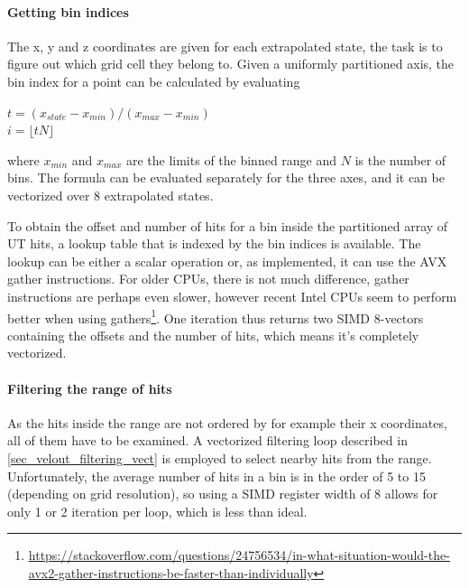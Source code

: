 \documentclass[12pt]{article}
\begin{document}
\paragraph{Getting bin indices} \mbox{}\vspace{0.4pc}

The x, y and z coordinates are given for each extrapolated state, the task is to figure out which grid cell they belong to. Given a uniformly partitioned axis, the bin index for a point can be calculated by evaluating
\begin{center}
	$t = (x_{state} - x_{min})/(x_{max} - x_{min})$\\
	$i =  \lfloor t N \rfloor$	
\end{center}
where $x_{min}$ and $x_{max}$ are the limits of the binned range and $N$ is the number of bins. The formula can be evaluated separately for the three axes, and it can be vectorized over 8 extrapolated states.

To obtain the offset and number of hits for a bin inside the partitioned array of UT hits, a lookup table that is indexed by the bin indices is available. The lookup can be either a scalar operation or, as implemented, it can use the AVX gather instructions. For older CPUs, there is not much difference, gather instructions are perhaps even slower, however recent Intel CPUs seem to perform better when using gathers\footnote{\href{https://stackoverflow.com/questions/24756534/in-what-situation-would-the-avx2-gather-instructions-be-faster-than-individually}{https://stackoverflow.com/questions/24756534/in-what-situation-would-the-avx2-gather-instructions-be-faster-than-individually}}. One iteration thus returns two SIMD 8-vectors containing the offsets and the number of hits, which means it's completely vectorized.


\paragraph{Filtering the range of hits} \mbox{}\vspace{0.4pc}

As the hits inside the range are not ordered by for example their x coordinates, all of them have to be examined. A vectorized filtering loop described in \ref{sec_velout_filtering_vect} is employed to select nearby hits from the range. Unfortunately, the average number of hits in a bin is in the order of 5 to 15 (depending on grid resolution), so using a SIMD register width of 8 allows for only 1 or 2 iteration per loop, which is less than ideal.
\end{document}

